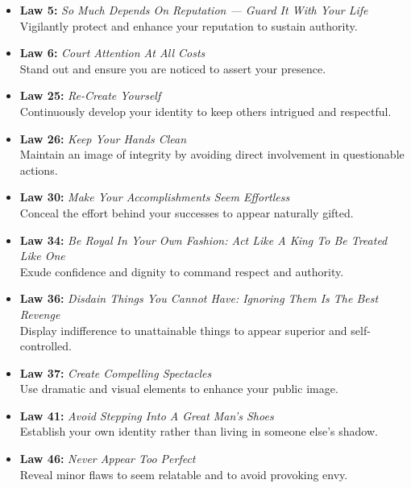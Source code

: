\documentclass[a4paper,10.8pt]{article}
\begin{document}
\begin{itemize}[leftmargin=*, label={--}]
    \item \textbf{Law 5:} \textit{So Much Depends On Reputation — Guard It With Your Life} \\
    Vigilantly protect and enhance your reputation to sustain authority.
    
    \item \textbf{Law 6:} \textit{Court Attention At All Costs} \\
    Stand out and ensure you are noticed to assert your presence.
    
    \item \textbf{Law 25:} \textit{Re-Create Yourself} \\
    Continuously develop your identity to keep others intrigued and respectful.
    
    \item \textbf{Law 26:} \textit{Keep Your Hands Clean} \\
    Maintain an image of integrity by avoiding direct involvement in questionable actions.
    
    \item \textbf{Law 30:} \textit{Make Your Accomplishments Seem Effortless} \\
    Conceal the effort behind your successes to appear naturally gifted.
    
    \item \textbf{Law 34:} \textit{Be Royal In Your Own Fashion: Act Like A King To Be Treated Like One} \\
    Exude confidence and dignity to command respect and authority.
    
    \item \textbf{Law 36:} \textit{Disdain Things You Cannot Have: Ignoring Them Is The Best Revenge} \\
    Display indifference to unattainable things to appear superior and self-controlled.
    
    \item \textbf{Law 37:} \textit{Create Compelling Spectacles} \\
    Use dramatic and visual elements to enhance your public image.
    
    \item \textbf{Law 41:} \textit{Avoid Stepping Into A Great Man's Shoes} \\
    Establish your own identity rather than living in someone else's shadow.
    
    \item \textbf{Law 46:} \textit{Never Appear Too Perfect} \\
    Reveal minor flaws to seem relatable and to avoid provoking envy.
\end{itemize}
\end{document}
